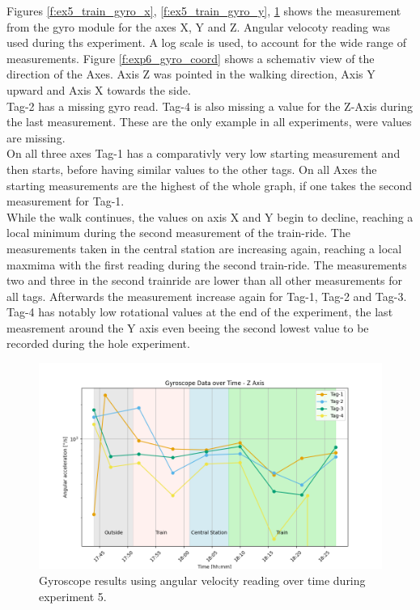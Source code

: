 Figures \ref{f:ex5_train_gyro_x}, \ref{f:ex5_train_gyro_y}, \ref{f:ex5_train_gyro_z} shows the measurement from the gyro module for the axes X, Y and Z.
Angular velocoty reading was used during ths experiment.
A log scale is used, to account for the wide range of measurements.
Figure \ref{f:exp6_gyro_coord} shows a schemativ view of the direction of the Axes.
Axis Z was pointed in the walking direction, Axis Y upward and Axis X towards the side.\\
Tag-2 has a missing gyro read. Tag-4 is also missing a value for the Z-Axis during the last measurement. These are the only example in all experiments, were values are missing.\\
On all three axes Tag-1 has a comparativly very low starting measurement and then starts, before having similar values to the other tags.
On all Axes the starting measurements are the highest of the whole graph, if one takes the second measurement for Tag-1. \\
While the walk continues, the values on axis X and Y begin to decline, reaching a local minimum during the second measurement of the train-ride.
The measurements taken in the central station are increasing again, reaching a local maxmima with the first reading during the second train-ride.
The measurements two and three in the second trainride are lower than all other measurements for all tags.
Afterwards the measurement increase again for Tag-1, Tag-2 and Tag-3.
Tag-4 has notably low rotational values at the end of the experiment, the last measrement around the Y axis even beeing the second lowest value to be recorded during the hole experiment.


\begin{figure}[ht!]
	\includegraphics[width=\linewidth]{graphics/exp/exp6_gyro_data_z_split_2.png}
	\caption{Gyroscope results using angular velocity reading over time during experiment 5.}
	\label{f:ex5_train_gyro_z}
\end{figure}

